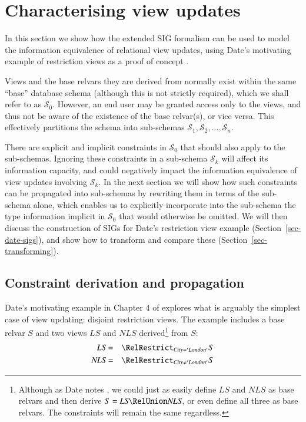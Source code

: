 \documentclass{sig-alternate-05-2015}
\newcounter{constraint}
\newcommand{\LS}{\ensuremath{\mathit{LS}}}
\newcommand{\NLS}{\ensuremath{\mathit{NLS}}}
\newcommand{\City}{\ensuremath{\mathit{City}}}
\newcommand{\SC}[1]{\ensuremath{\mathcal{S}_{#1}}}
\begin{document}


\section{Characterising view updates}
\label{sec-characterising}

\noindent In this section we show how the extended SIG formalism can be used to model the information equivalence of relational view updates, using Date's motivating example of restriction views as a proof of concept \cite{Date.C-2013a-View}.

Views and the base relvars they are derived from normally exist within the same ``base'' database schema (although this is not strictly required), which we shall refer to as \(\SC{0}\). However, an end user may be granted access only to the views, and thus not be aware of the existence of the base relvar(s), or vice versa. This effectively partitions the schema into sub-schemas \(\SC{1}, \SC{2}, \dotsc, \SC{n}\).

There are explicit and implicit constraints in \(\SC{0}\) that should also apply to the sub-schemas. Ignoring these constraints in a sub-schema \(\SC{k}\) will affect its information capacity, and could negatively impact the information equivalence of view updates involving \(\SC{k}\). In the next section we will show how such constraints can be propagated into sub-schemas by rewriting them in terms of the sub-schema alone, which enables us to explicitly incorporate into the sub-schema the type information implicit in \(\SC{0}\) that would otherwise be omitted. We will then discuss the construction of SIGs for Date's restriction view example (Section~\ref{sec-date-sigs}), and show how to transform and compare these (Section~\ref{sec-transforming}).




\subsection{Constraint derivation and propagation}
\label{sec-constraints}

\noindent Date's motivating example in Chapter 4 of \cite{Date.C-2013a-View} explores what is arguably the simplest case of view updating: disjoint restriction views. The example includes a base relvar \(S\!\) and two views \(\LS\) and \(\NLS\) derived\footnote{Although as Date notes \cite{Date.C-2013a-View}, we could just as easily define \(\LS\) and \(\NLS\) as base relvars and then derive \(S = \LS \RelUnion \NLS\), or even define all three as base relvars. The constraints will remain the same regardless.} from \(S\!\):
\begin{eqnarray}
    \LS  & = & \RelRestrict_{\City = \mathit{'London'}}S \label{eqn-ls}   \\
    \NLS & = & \RelRestrict_{\City \ne \mathit{'London'}}S \label{eqn-nls}
\end{eqnarray}
\end{document}
